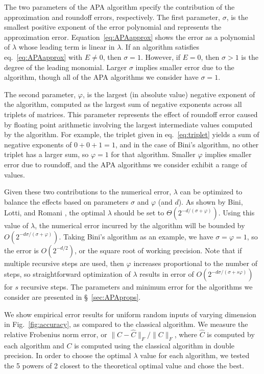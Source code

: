 \documentclass[manuscript]{acmart}
\begin{document}
The two parameters of the APA algorithm specify the contribution of the approximation and roundoff errors, respectively.
The first parameter, $\sigma$, is the smallest positive exponent of the error polynomial and represents the approximation error.
Equation~\eqref{eq:APAapprox} shows the error as a polynomial of $\lambda$ whose leading term is linear in $\lambda$.
If an algorithm satisfies eq.~\eqref{eq:APAapprox} with $E\neq 0$, then $\sigma=1$.
However, if $E=0$, then $\sigma>1$ is the degree of the leading monomial.
Larger $\sigma$ implies smaller error due to the algorithm, though all of the APA algorithms we consider have $\sigma=1$.

The second parameter, $\varphi$, is the largest (in absolute value) negative exponent of the algorithm, computed as the largest sum of negative exponents across all triplets of matrices.
This parameter represents the effect of roundoff error caused by floating point arithmetic involving the largest intermediate values computed by the algorithm.
For example, the triplet given in eq.~\eqref{eq:triplet} yields a sum of negative exponents of $0+0+1=1$, and in the case of Bini's algorithm, no other triplet has a larger sum, so $\varphi=1$ for that algorithm.
Smaller $\varphi$ implies smaller error due to roundoff, and the APA algorithms we consider exhibit a range of values.

Given these two contributions to the numerical error, $\lambda$ can be optimized to balance the effects based on parameters $\sigma$ and $\varphi$ (and $d$).
As shown by Bini, Lotti, and Romani \cite{BLR80}, the optimal $\lambda$ should be set to $\Theta(2^{-d/(\sigma+\varphi)})$.
Using this value of $\lambda$, the numerical error incurred by the algorithm will be bounded by $O(2^{-d\sigma/(\sigma+\varphi)})$.
Taking Bini's algorithm as an example, we have $\sigma=\varphi=1$, so the error is $O(2^{-d/2})$, or the square root of working precision.
Note that if multiple recursive steps are used, then $\varphi$ increases proportional to the number of steps, so straightforward optimization of $\lambda$ results in error of $O(2^{-d\sigma/(\sigma+s\varphi)})$ for $s$ recursive steps.
The parameters and minimum error for the algorithms we consider are presented in \S~\ref{sec:APAprops}.

We show empirical error results for uniform random inputs of varying dimension in Fig.~\ref{fig:accuracy}, as compared to the classical algorithm.
We measure the relative Frobenius norm error, or $\|C-\hat C\|_F/\|C\|_F$, where $\hat C$ is computed by each algorithm and $C$ is computed using the classical algorithm in double precision.
In order to choose the optimal $\lambda$ value for each algorithm, we tested the 5 powers of 2 closest to the theoretical optimal value and chose the best.
\end{document}
